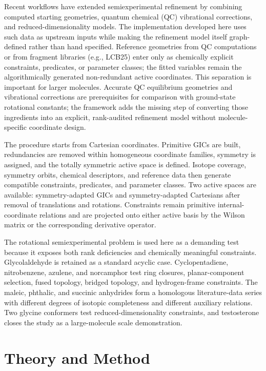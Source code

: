 \documentclass[aip,jcp,reprint,longbibliography,floatfix]{revtex4-2}
\begin{document}
Recent workflows have extended semiexperimental refinement by combining
computed starting geometries, quantum chemical (QC) vibrational corrections, and
reduced-dimensionality models.\cite{Mendolicchio2025FastDvib} The implementation
developed here uses such data as upstream inputs while making the refinement
model itself graph-defined rather than hand specified. Reference geometries from QC
computations or from fragment libraries (e.g., LCB25\cite{Lazzari2025LCB25})
enter only as chemically explicit constraints, predicates, or parameter
classes; the fitted variables remain the algorithmically generated
non-redundant active coordinates. This separation is important for larger
molecules. Accurate QC equilibrium geometries and vibrational corrections are
prerequisites for comparison with ground-state rotational constants; the
framework adds the missing step of converting those ingredients into an
explicit, rank-audited refinement model without molecule-specific coordinate
design.

The procedure starts from Cartesian coordinates. Primitive GICs are built,
redundancies are removed within homogeneous coordinate families, symmetry is
assigned, and the totally symmetric active space is defined. Isotope coverage,
symmetry orbits, chemical descriptors, and reference data then generate
compatible constraints, predicates, and parameter classes. Two active spaces
are available: symmetry-adapted GICs and symmetry-adapted Cartesians after
removal of translations and rotations. Constraints remain primitive
internal-coordinate relations and are projected onto either active basis by
the Wilson matrix or the corresponding derivative operator.\cite{Wilson1955}

The rotational semiexperimental problem is used here as a demanding test
because it exposes both rank deficiencies and chemically meaningful
constraints. Glycolaldehyde is retained as a standard acyclic case.
Cyclopentadiene, nitrobenzene, azulene, and norcamphor test ring closures,
planar-component selection, fused topology, bridged topology, and
hydrogen-frame constraints. The maleic, phthalic, and succinic anhydrides form
a homologous literature-data series with different degrees of isotopic
completeness and different auxiliary relations. Two glycine conformers test
reduced-dimensionality constraints, and testosterone closes the study as a
large-molecule scale demonstration.


\section{Theory and Method}
\end{document}

